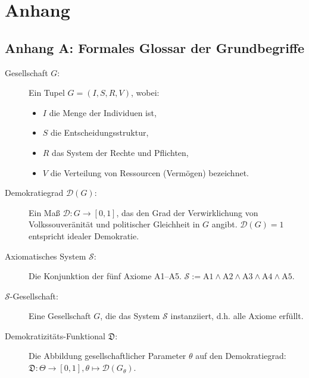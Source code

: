 
\chapter*{Anhang}
\label{chap:anhang}

\section*{Anhang A: Formales Glossar der Grundbegriffe}
\label{anhang:glossar}

\begin{description}
    \item[Gesellschaft $G$:] Ein Tupel $G = (I, S, R, V)$, wobei:
        \begin{itemize}
            \item $I$ die Menge der Individuen ist,
            \item $S$ die Entscheidungsstruktur,
            \item $R$ das System der Rechte und Pflichten,
            \item $V$ die Verteilung von Ressourcen (Vermögen) bezeichnet.
        \end{itemize}
    
    \item[Demokratiegrad $\mathcal{D}(G)$:] Ein Maß $\mathcal{D}: G \rightarrow [0,1]$, das den Grad der Verwirklichung von Volkssouveränität und politischer Gleichheit in $G$ angibt. $\mathcal{D}(G)=1$ entspricht idealer Demokratie.
    
    \item[Axiomatisches System $\mathcal{S}$:] Die Konjunktion der fünf Axiome A1–A5. $\mathcal{S} := \text{A1} \land \text{A2} \land \text{A3} \land \text{A4} \land \text{A5}$.
    
    \item[$\mathcal{S}$-Gesellschaft:] Eine Gesellschaft $G$, die das System $\mathcal{S}$ instanziiert, d.h. alle Axiome erfüllt.
    
    \item[Demokratizitäts-Funktional $\mathfrak{D}$:] Die Abbildung gesellschaftlicher Parameter $\theta$ auf den Demokratiegrad: $\mathfrak{D}: \Theta \rightarrow [0,1], \theta \mapsto \mathcal{D}(G_\theta)$.
    

\end{description}
